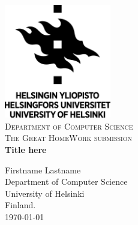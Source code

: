 \begin{titlepage}
\begin{center}

\includegraphics[width=0.35\textwidth]{./uh_logo}~\\[0.5 cm]

\textsc{\Large Department of Computer Science}\\[1.5cm]

\textsc{\large The Great HomeWork submission}\\[1.5cm]


{ \huge \bfseries Title here \\[0.4cm] }


\Large Firstname Lastname \\
\large Department of Computer Science \\ University of Helsinki \\Finland.
\\ [4 cm]

\Large \today

\end{center}
\end{titlepage}